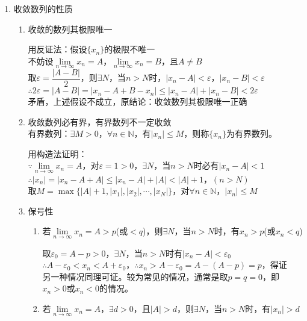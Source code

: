 \documentclass[11pt,fleqn]{book} %
\begin{document}
\begin{enumerate}
  \item 收敛数列的性质
\begin{enumerate}[label=(\arabic*)]
  \item 收敛的数列其极限唯一
\begin{prove}
用反证法：假设$\{x_n\}$的极限不唯一\\
不妨设$\lim\limits_{n\rightarrow \infty} x_n=A$，$\lim\limits_{n\rightarrow \infty} x_n=B$，且$A \neq B$\\
取$\varepsilon = \dfrac{|A-B|}{2}$，则$\exists N$，当$n>N$时，$|x_n-A|<\varepsilon$，$|x_n-B|<\varepsilon$\\
$\therefore 2\varepsilon=|A-B|=|x_n-A+B-x_n|\leqslant |x_n-A|+|x_n-B|<2\varepsilon$\\
矛盾，上述假设不成立，原结论：收敛数列其极限唯一正确
\end{prove}
  \item 收敛数列必有界，有界数列不一定收敛\\
    有界数列：$\exists M>0$，$\forall n \in \mathds{N}$，有$|x_n|\leqslant M$，则称$\{x_n\}$为有界数列。
\begin{prove}
 用构造法证明：\\
$\because \lim\limits_{n\rightarrow \infty} x_n=A$，对$\varepsilon=1>0$，$\exists N$，当$n>N$时必有$|x_n-A|<1$\\
$\therefore |x_n|=|x_n-A+A|\leqslant |x_n-A|+|A|<|A|+1$，$(n>N)$\\
取$M = \max\{|A|+1, |x_1|, |x_2|, \cdots, |x_N|\}$，对$\forall n \in \mathds{N}$，$|x_n|\leqslant M$
\end{prove}
  \item 保号性\begin{enumerate}[label=(\roman*)]
               \item 若$\lim\limits_{n\rightarrow \infty} x_n=A>p$(或$<q$)，则$\exists N$，当$n>N$时，有$x_n>p$(或$x_n<q$)
                \begin{prove}
                   取$\varepsilon_0=A-p>0$，$\exists N$，当$n>N$时有$|x_n-A|<\varepsilon_0$\\
                    $\therefore A-\varepsilon_0<x_n<A+\varepsilon_0$，$\therefore x_n>A-\varepsilon_0=A-(A-p)=p$，得证\\
                    另一种情况同理可证。较为常见的情况，通常是取$p=q=0$，即$x_n>0$或$x_n<0$的情况。
                \end{prove}
               \item 若$\lim\limits_{n\rightarrow \infty} x_n=A$，$\exists d>0$，且$|A|>d$，则$\exists N$，当$n>N$时，有$|x_n|>d$

\end{enumerate}
\end{enumerate}
\end{enumerate}
\end{document}
